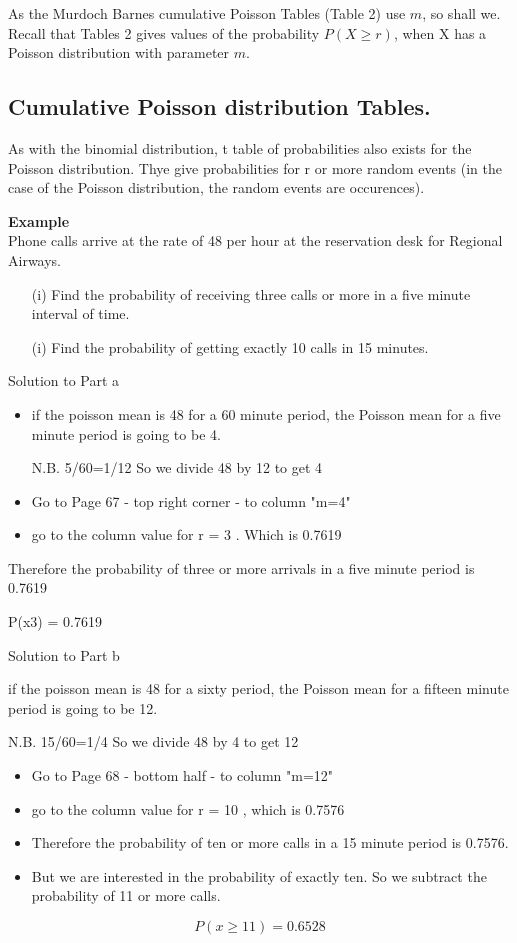 \documentclass[]{report}
\begin{document}
\bigskip
As the Murdoch Barnes cumulative Poisson Tables (Table 2) use $m$, so shall we. Recall that Tables 2 gives values of the probability $P(X \geq r )$, when X has a Poisson distribution with
parameter $m$.
\subsection{Cumulative Poisson distribution Tables.}
As with the binomial distribution, t table of probabilities also exists for the Poisson distribution. Thye give probabilities for r or more random events (in the case of the Poisson distribution, the random events are occurences).

\noindent \textbf{Example}\\
Phone calls arrive at the rate of 48 per hour at the reservation desk for Regional Airways.
\begin{itemize}
\item[(i)]  Find the probability of receiving  three calls or more in a five minute interval of time.
\item[(i)] Find the probability of getting exactly 10 calls in 15 minutes.
\end{itemize}
Solution to Part a

\begin{itemize}
\item if the poisson mean  is 48 for a 60 minute period, the Poisson mean for a five minute period is going to be 4.

N.B.   5/60=1/12          So we divide 48 by 12 to get 4

\item Go to Page 67  - top right corner - to column "m=4"

\item go to the column value for r = 3 . Which is 0.7619
\end{itemize} 
Therefore the probability of three or more arrivals in a five minute period is 0.7619

P(x3) = 0.7619 

Solution to Part b

if the poisson mean  is 48 for a sixty period, the Poisson mean for a fifteen minute period is going to be 12.

N.B.   15/60=1/4          So we divide 48 by 4 to get 12

\begin{itemize}
\item Go to Page 68  - bottom half - to column "m=12"
\item go to the column value for r = 10 , which is 0.7576
\item Therefore the probability of ten or more calls in a 15 minute period is 0.7576.
\item But we are interested in the probability of exactly ten. So we subtract the probability of 11 or more calls.
\end{itemize}
\[P(x \geq 11) = 0.6528\]
\end{document}
